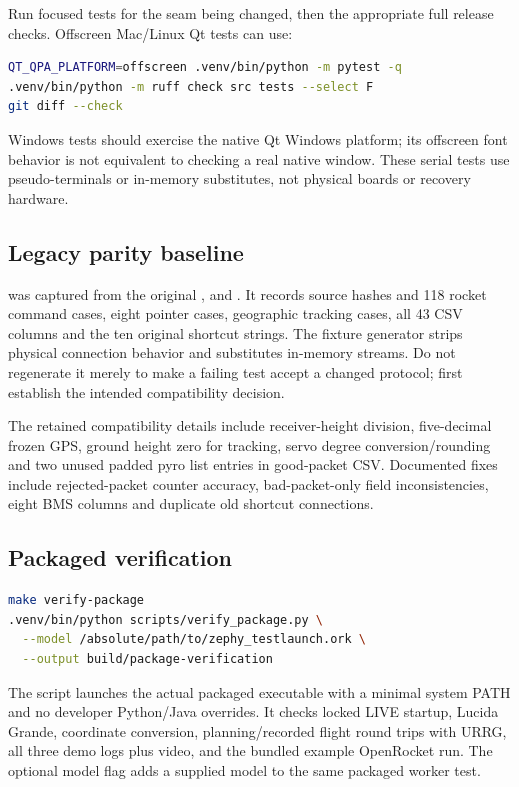 Run focused tests for the seam being changed, then the appropriate full release
checks. Offscreen Mac/Linux Qt tests can use:
\begin{lstlisting}[language=bash]
QT_QPA_PLATFORM=offscreen .venv/bin/python -m pytest -q
.venv/bin/python -m ruff check src tests --select F
git diff --check
\end{lstlisting}
Windows tests should exercise the native Qt Windows platform; its offscreen
font behavior is not equivalent to checking a real native window.
These serial tests use pseudo-terminals or in-memory substitutes, not physical
boards or recovery hardware.

\subsection{Legacy parity baseline}
 was captured from the original
,  and . It records source hashes and
118 rocket command cases, eight pointer cases, geographic tracking cases,
all 43 CSV columns and the ten original shortcut strings.
The fixture generator strips physical connection behavior and substitutes
in-memory streams. Do not regenerate it merely to make a failing test accept
a changed protocol; first establish the intended compatibility decision.

The retained compatibility details include receiver-height division, five-decimal
frozen GPS, ground height zero for tracking, servo degree conversion/rounding and
two unused padded pyro list entries in good-packet CSV. Documented fixes include
rejected-packet counter accuracy, bad-packet-only field inconsistencies, eight
BMS columns and duplicate old shortcut connections.

\subsection{Packaged verification}
\begin{lstlisting}[language=bash]
make verify-package
.venv/bin/python scripts/verify_package.py \
  --model /absolute/path/to/zephy_testlaunch.ork \
  --output build/package-verification
\end{lstlisting}
The script launches the actual packaged executable with a minimal system PATH
and no developer Python/Java overrides. It checks locked LIVE startup,
Lucida Grande, coordinate conversion, planning/recorded flight round trips with
URRG, all three demo logs plus video, and the bundled example OpenRocket run.
The optional model flag adds a supplied model to the same packaged worker test.

